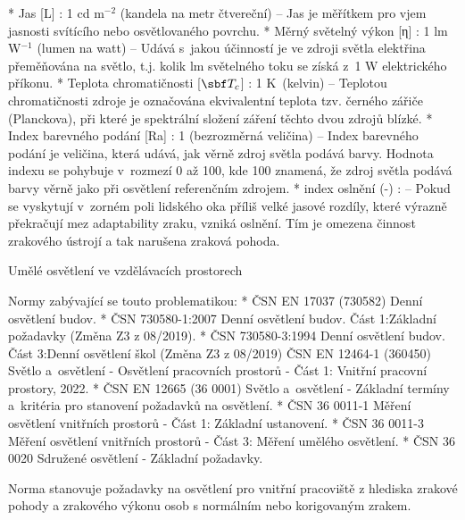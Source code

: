 \begitems
* {\sbf Jas [L]} : 1 cd m$^{-2}$ (kandela na metr čtvereční)
    -- Jas je měřítkem pro vjem jasnosti svítícího nebo osvětlovaného povrchu.
* {\sbf Měrný světelný výkon [η]} : 1 lm W$^{-1}$ (lumen na watt) --
    Udává s~jakou účinností je ve zdroji světla elektřina přeměňována na světlo, t.j. kolik
    lm světelného toku se získá z~1 W elektrického příkonu.
* {\sbf Teplota chromatičnosti [$\sbf T_c$]} : 1 K~(kelvin) -- Teplotou chromatičnosti zdroje je označována ekvivalentní
    teplota tzv. černého zářiče (Planckova), při které je spektrální složení záření těchto dvou zdrojů blízké.
* {\sbf Index barevného podání [Ra]} : 1 (bezrozměrná veličina) --
    Index barevného podání je veličina, která udává, jak věrně zdroj světla podává barvy.
    Hodnota indexu se pohybuje v~rozmezí 0 až 100, kde 100 znamená, že zdroj světla podává barvy věrně
    jako při osvětlení referenčním zdrojem.
* {\sbf index oslnění  (-)} : -- Pokud se vyskytují v~zorném poli lidského oka příliš velké
    jasové rozdíly, které výrazně překračují mez adaptability zraku, vzniká oslnění.
    Tím je omezena činnost zrakového ústrojí a tak narušena zraková pohoda.
\enditems

\sec Umělé osvětlení ve vzdělávacích prostorech

Normy zabývající se touto problematikou:
\begitems
* ČSN EN 17037 (730582) Denní osvětlení budov.
* ČSN 730580-1:2007 Denní osvětlení budov. Část 1:Základní požadavky (Změna Z3 z 08/2019).
* ČSN 730580-3:1994 Denní osvětlení budov. Část 3:Denní osvětlení škol (Změna Z3 z 08/2019)
ČSN EN 12464-1 (360450) Světlo a~osvětlení - Osvětlení pracovních prostorů - Část 1: Vnitřní pracovní prostory, 2022.
* ČSN EN 12665 (36 0001) Světlo a~osvětlení - Základní termíny a~kritéria pro stanovení požadavků na osvětlení.
* ČSN 36 0011-1 Měření osvětlení vnitřních prostorů - Část 1: Základní ustanovení.
* ČSN 36 0011-3 Měření osvětlení vnitřních prostorů - Část 3: Měření umělého osvětlení.
* ČSN 36 0020 Sdružené osvětlení - Základní požadavky.
\enditems

\noindent

Norma stanovuje požadavky na osvětlení pro vnitřní pracoviště z hlediska zrakové pohody a zrakového výkonu osob s normálním nebo korigovaným zrakem.


